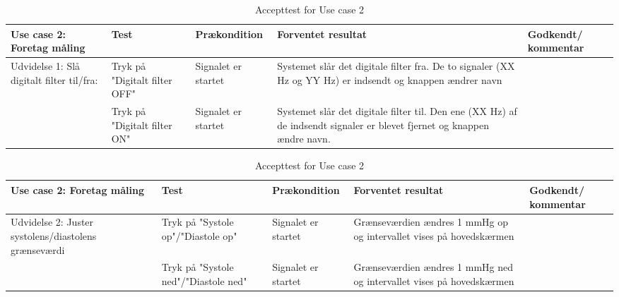\begin{table}[H]
\caption{Accepttest for Use case 2}\label{tab:tabel11}
\begin{tabular}{|>{\raggedright\arraybackslash}p{2.5cm}| >{\raggedright\arraybackslash}p{2.9cm} | >{\raggedright\arraybackslash}p{2.9cm} | >{\raggedright\arraybackslash}p{2.9cm} | >{\raggedright\arraybackslash}p{2.8cm} |}
   \hline
   \textbf{Use case 2: Foretag måling} &\textbf{Test}& \textbf{Prækondition} & \textbf{Forventet resultat} & \textbf{Godkendt/ kommentar}\\ \hline
   Udvidelse 1: Slå digitalt filter til/fra:& Tryk på "Digitalt filter OFF" & Signalet er startet & Systemet slår det digitale filter fra. De to signaler (XX Hz og YY Hz) er indsendt og knappen ændrer navn &\\\hline
   &Tryk på "Digitalt filter ON" & Signalet er startet & Systemet slår det digitale filter til. Den ene (XX Hz) af de indsendt signaler er blevet fjernet og knappen ændre navn. &\\\hline
\end{tabular}
\end{table}


\begin{table}[H]
\caption{Accepttest for Use case 2}\label{tab:tabel12}
\begin{tabular}{|>{\raggedright\arraybackslash}p{2.5cm}| >{\raggedright\arraybackslash}p{2.9cm} | >{\raggedright\arraybackslash}p{2.9cm} | >{\raggedright\arraybackslash}p{2.9cm} | >{\raggedright\arraybackslash}p{2.8cm} |}
   \hline
   \textbf{Use case 2: Foretag måling } &\textbf{Test}& \textbf{Prækondition} & \textbf{Forventet resultat} & \textbf{Godkendt/ kommentar}\\ \hline
   Udvidelse 2: Juster systolens/diastolens grænseværdi& Tryk på "Systole op"/"Diastole op"& Signalet er startet & Grænseværdien ændres 1 mmHg op og intervallet vises på hovedskærmen &\\\hline
   &Tryk på "Systole ned"/"Diastole ned" & Signalet er startet & Grænseværdien ændres 1 mmHg ned og intervallet vises på hovedskærmen & \\\hline
\end{tabular}
\end{table}




